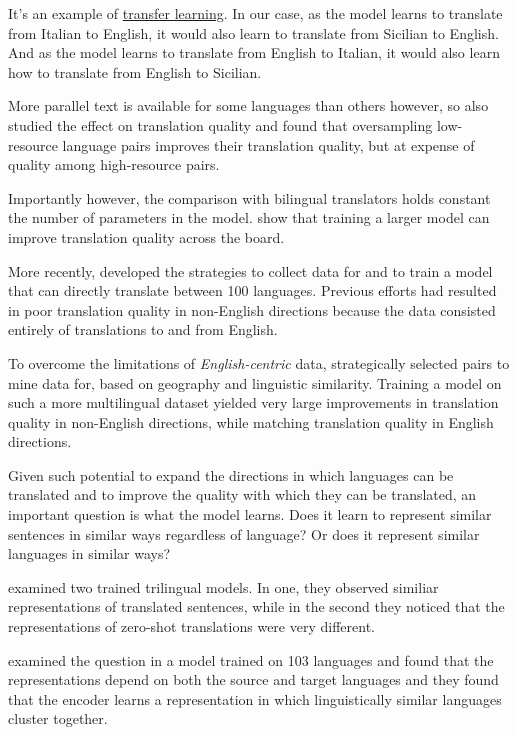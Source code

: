 \documentclass[10pt,letterpaper]{article}
\begin{document}
It's an example of \href{https://en.wikipedia.org/wiki/Transfer_learning}{transfer learning}. 
In our case, as the model learns to translate from Italian to English, it would also learn to translate 
from Sicilian to English.  And as the model learns to translate from English to Italian, 
it would also learn how to translate from English to Sicilian.
      
More parallel text is available for some languages than others however, so 
\citeauthor{johnson2017zeroshot} also studied the effect on translation quality
and found that oversampling low-resource language pairs improves
their translation quality, but at expense of quality among high-resource pairs.
      
Importantly however, the comparison with bilingual translators holds constant the number of parameters in the model.
\citet{arivazhagan2019massively} show that training a larger model can improve translation quality across the board.
      
More recently, \citet{fan2020beyond} developed the strategies to collect data for and
to train a model that can directly translate between 100 languages.
Previous efforts had resulted in poor translation quality in
non-English directions because the data consisted entirely of translations to and from English.

To overcome the limitations of \textit{English-centric} data, \citeauthor{fan2020beyond}
strategically selected pairs to mine data for, based on geography and linguistic similarity.
Training a model on such a more multilingual dataset yielded very large improvements in translation
quality in non-English directions, while matching translation quality in English directions.
      
Given such potential to expand the directions in which languages can be translated and to improve 
the quality with which they can be translated, an important question is what the model learns.    
Does it learn to represent similar sentences in similar ways regardless of language?
Or does it represent similar languages in similar ways?
      
\citeauthor{johnson2017zeroshot} examined two trained trilingual models.
In one, they observed similiar representations of translated sentences,
while in the second they noticed that the representations of zero-shot translations were very different.
      
\citet{kudugunta2019investigating} examined the question in a model trained on 103 languages
and found that the representations depend on both the source and target languages
and they found that the encoder learns a representation in which 
linguistically similar languages cluster together.
\end{document}
